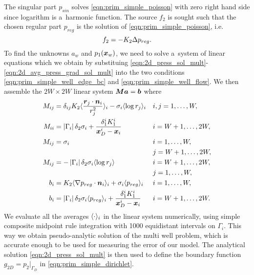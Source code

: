 The singular part $p_{sin}$ solves \eqref{eqn:prim_simple_poisson} with zero right hand side since logarithm is a~harmonic function.
The source $f_2$ is sought such that the chosen regular part $p_{reg}$ is the solution of \eqref{eqn:prim_simple_poisson}, i.e.
\begin{equation}
    f_2 = -K_2 \Delta p_{reg}.
\end{equation}
To find the unknowns $a_w$ and $p_1(\mathbf{\boldsymbol{x}}_w)$, we need to solve a~system of linear equations
which we obtain by substituing \eqref{eqn:2d_press_sol_mult}-\eqref{eqn:2d_avg_press_grad_sol_mult}
into the two conditions \eqref{eqn:prim_simple_well_edge_bc} and \eqref{eqn:prim_simple_well_flow}.
We then assemble the $2W\times 2W$ linear system $\mathbf{\boldsymbol{M}}\mathbf{\boldsymbol{a}} = \mathbf{\boldsymbol{b}}$ where
\begin{subequations}
\label{eqn:2d_press_linear_system}
\begin{align}
M_{ij} &= \delta_{ij} K_2\avg{\frac{\vc r_j \cdot \vc n_i}{r_j^2}}_i - \sigma_i\avg{\log r_j}_i && i,j=1,\ldots,W, \\
%
M_{ii} &= \abs{\Gamma_i}\delta_2\sigma_i + \frac{\delta^i_1 K^i_1}{\bx^i_D-\bx_i} && i=W+1,\ldots,2W,\\
%
M_{ij} &= \sigma_i && i=1,\ldots,W,\\
    &&& j=W+1,\ldots,2W,\\
M_{ij} &= -\abs{\Gamma_i}\delta_2\sigma_i \avg{\log r_j} && i=W+1,\ldots,2W,\\
    &&& j=1,\ldots,W,\\
b_{i} &= K_2 \avg{\grad p_{reg}\cdot \vc n_i}_i + \sigma_i\avg{p_{reg}}_i && i=1,\ldots,W,\\
b_{i} &= \abs{\Gamma_i}\delta_2\sigma_i \avg{p_{reg}}_i + \frac{\delta^i_1 K^i_1}{\bx^i_D-\bx_i} && i=W+1,\ldots,2W.
\end{align}
\end{subequations}
We evaluate all the averages $\langle\cdot\rangle_i$ in the linear system numerically,
using simple composite midpoint rule integration with 1000 equidistant intervals on $\Gamma_i$.
This way we obtain pseudo-analytic solution of the multi well problem, which is accurate enough
to be used for measuring the error of our model.
The analytical solution \eqref{eqn:2d_press_sol_mult} is then used 
to define the boundary function $g_{2D} = p_2|_{\Gamma_D}$ in \eqref{eqn:prim_simple_dirichlet}.



